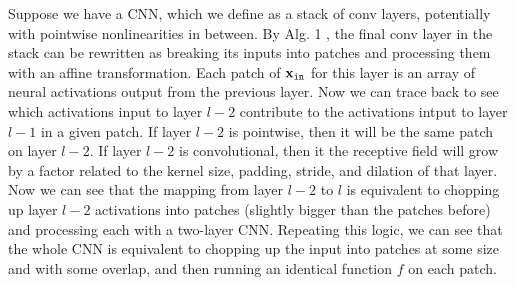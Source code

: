 Suppose we have a CNN, which we define as a stack of conv layers, potentially with pointwise nonlinearities in between. By Alg. 1 %
, the final conv layer in the stack can be rewritten as breaking its inputs into patches and processing them with an affine transformation. Each patch of $\mathbf{x}_{\texttt{in}}$ for this layer is an array of neural activations output from the previous layer. Now we can trace back to see which activations input to layer $l-2$ contribute to the activations intput to layer $l-1$ in a given patch. If layer $l-2$ is pointwise, then it will be the same patch on layer $l-2$. If layer $l-2$ is convolutional, then it the receptive field will grow by a factor related to the kernel size, padding, stride, and dilation of that layer. Now we can see that the mapping from layer $l-2$ to $l$ is equivalent to chopping up layer $l-2$ activations into patches (slightly bigger than the patches before) and processing each with a two-layer CNN. Repeating this logic, we can see that the whole CNN is equivalent to chopping up the input into patches at some size and with some overlap, and then running an identical function $f$ on each patch.






